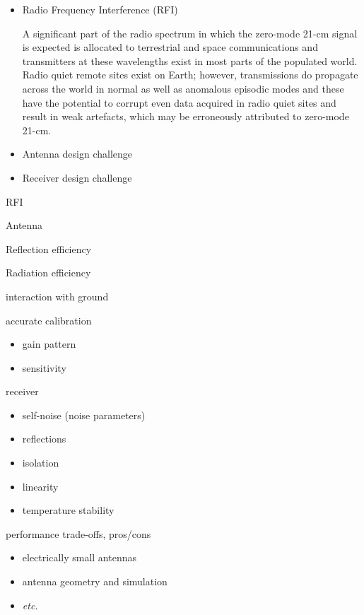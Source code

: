 \begin{itemize}
\item
Radio Frequency Interference (RFI)

A significant part of the radio spectrum in which the zero-mode 21-cm signal is expected is allocated to terrestrial and space communications and transmitters at these wavelengths exist in most parts of the populated world.  Radio quiet remote sites exist on Earth; however, transmissions do propagate across the world in normal as well as anomalous episodic modes and these have the potential to corrupt even data acquired in radio quiet sites and result in weak artefacts, which may be erroneously attributed to zero-mode 21-cm.  

\item
Antenna design challenge

\item 
Receiver design challenge

\end{itemize}

RFI

Antenna

Reflection efficiency

Radiation efficiency

interaction with ground

accurate calibration

\begin{itemize}
\item
  gain pattern
\item
  sensitivity{~}
\end{itemize}

receiver

\begin{itemize}
\item
  self-noise (noise parameters)
\item
  reflections
\item
  isolation
\item
  linearity
\item
  temperature stability
\end{itemize}

performance trade-offs, pros/cons

\begin{itemize}
\item
  electrically small antennas
\item
  antenna geometry and simulation
\item
  \emph{etc.}
\end{itemize}

